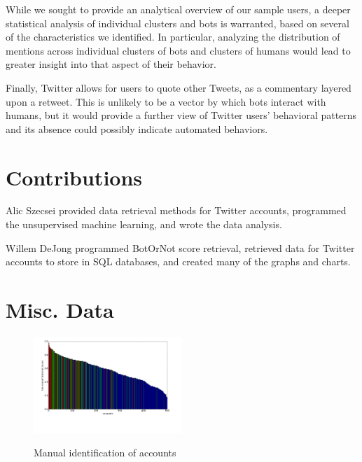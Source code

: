 \documentclass{sig-alternate-05-2015}
\begin{document}
While we sought to provide an analytical overview of our sample users, a deeper statistical analysis of individual clusters and bots is warranted, based on several of the characteristics we identified. In particular, analyzing the distribution of mentions across individual clusters of bots and clusters of humans would lead to greater insight into that aspect of their behavior.

Finally, Twitter allows for users to quote other Tweets, as a commentary layered upon a retweet. This is unlikely to be a vector by which bots interact with humans, but it would provide a further view of Twitter users' behavioral patterns and its absence could possibly indicate automated behaviors.

%

%
%

\appendix
\section{Contributions}
Alic Szecsei provided data retrieval methods for Twitter accounts, programmed the unsupervised machine learning, and wrote the data analysis.

Willem DeJong programmed BotOrNot score retrieval, retrieved data for Twitter accounts to store in SQL databases, and created many of the graphs and charts.

\section{Misc. Data}

\begin{figure}[h!]
	\caption{Manual identification of accounts}
	\centering
		\includegraphics[width=0.5\textwidth]{imgs/barvsaccnt}
	\label{fig:barvsaccnt}
\end{figure}
\end{document}
